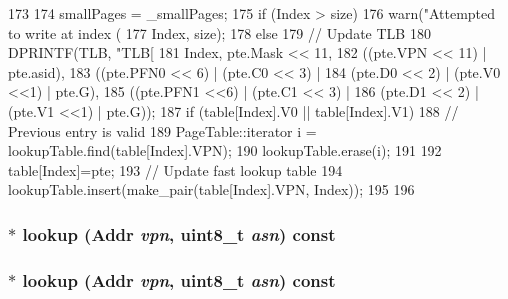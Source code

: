 \begin{DoxyCode}
173 {
174     smallPages = _smallPages;
175     if (Index > size) {
176         warn("Attempted to write at index (%
177                 Index, size);
178     } else {
179         // Update TLB
180         DPRINTF(TLB, "TLB[%
181                 Index, pte.Mask << 11,
182                 ((pte.VPN << 11) | pte.asid),
183                 ((pte.PFN0 << 6) | (pte.C0 << 3) |
184                  (pte.D0 << 2) | (pte.V0 <<1) | pte.G),
185                 ((pte.PFN1 <<6) | (pte.C1 << 3) |
186                  (pte.D1 << 2) | (pte.V1 <<1) | pte.G));
187         if (table[Index].V0 || table[Index].V1) {
188             // Previous entry is valid
189             PageTable::iterator i = lookupTable.find(table[Index].VPN);
190             lookupTable.erase(i);
191         }
192         table[Index]=pte;
193         // Update fast lookup table
194         lookupTable.insert(make_pair(table[Index].VPN, Index));
195     }
196 }
\end{DoxyCode}
\hypertarget{classMipsISA_1_1TLB_acf8939ee59401397cfe789c6edbf9be2}{
\subsubsection[{lookup}]{$\ast$ lookup ({\bf Addr} {\em vpn}, \/  uint8\_\-t {\em asn}) const}}
\label{classMipsISA_1_1TLB_acf8939ee59401397cfe789c6edbf9be2}
\hypertarget{classMipsISA_1_1TLB_a68714a0d5f62e6b1d8520c5feddc33fb}{
\subsubsection[{lookup}]{ $\ast$ lookup ({\bf Addr} {\em vpn}, \/  uint8\_\-t {\em asn}) const}}
\label{classMipsISA_1_1TLB_a68714a0d5f62e6b1d8520c5feddc33fb}



